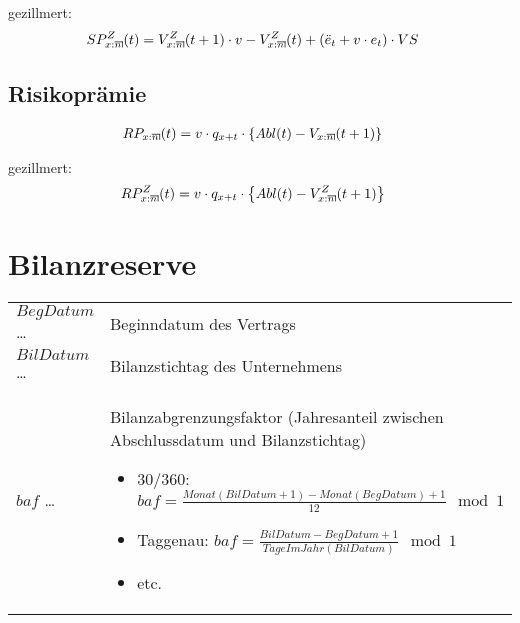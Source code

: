 \documentclass[a4paper,10pt]{article}
\makeatletter
\newcommand{\xn}{{\act[x]{n}}}
\DeclareRobustCommand{\act}[2][]{%
\def\arraystretch{0}%
\setlength\arraycolsep{0.5pt}%
\setlength\arrayrulewidth{0.5pt}%
\setbox0=\hbox{$\scriptstyle#1\ifx#1\empty{asdf}\else:\fi#2$}%
\begin{array}[b]{*2{@{}>{\scriptstyle}c}|}
\cline{2-2}%
\rule[1.25pt]{0pt}{\ht0}%
#1\ifx#1\empty\else:\fi & #2%
\end{array}%
}
\makeatother
\begin{document}
gezillmert:
\begin{align*}
SP^Z_\xn(t) &= V^Z_\xn(t+1) \cdot v - V^Z_\xn(t) + \left(\ddot{e}_t + v\cdot e_t\right)\cdot VS
\end{align*}

\subsection{Risikoprämie}
\begin{align*}
RP_\xn(t) &= v\cdot q_{x+t} \cdot \left\{Abl(t) - V_\xn(t+1)\right\}
\end{align*}

gezillmert:
\begin{align*}
RP^Z_\xn(t) &= v\cdot q_{x+t} \cdot \left\{Abl(t) - V^Z_\xn(t+1)\right\}
\end{align*}



\section{Bilanzreserve}

\begin{tabular}{lp{14cm}}
$BegDatum$ \dots & Beginndatum des Vertrags\\
$BilDatum$ \dots & Bilanzstichtag  des Unternehmens\\
$baf$ \dots & Bilanzabgrenzungsfaktor (Jahresanteil zwischen Abschlussdatum und Bilanzstichtag)
\begin{itemize}
 \item 30/360: $baf=\frac{Monat(BilDatum+1)-Monat(BegDatum)+1}{12} \mod 1$
 \item Taggenau: $baf=\frac{BilDatum-BegDatum+1}{TageImJahr(BilDatum)} \mod 1$
 \item etc.
\end{itemize}
\\
\end{tabular}
\end{document}
